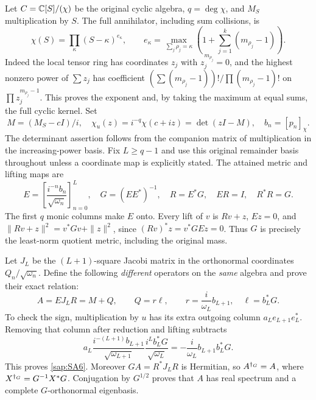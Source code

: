 Let $C=\mathbb C[S]/(\chi)$ be the original cyclic algebra,
$q=\deg\chi$, and $M_S$ multiplication by $S$.
The full annihilator, including sum collisions, is
\begin{equation}\tag{SA3}\label{sap:SA3}
\chi(S)=\prod_\kappa(S-\kappa)^{e_\kappa},
\qquad
e_\kappa=\max_{\sum_j\rho_j=\kappa}
\left(1+\sum_{j=1}^k(m_{\rho_j}-1)\right).
\end{equation}
Indeed the local tensor ring has coordinates $z_j$ with
$z_j^{m_{\rho_j}}=0$, and the highest nonzero power of
$\sum z_j$ has coefficient
$(\sum(m_{\rho_j}-1))!/\prod(m_{\rho_j}-1)!$ on
$\prod z_j^{m_{\rho_j}-1}$. This proves the exponent and,
by taking the maximum at equal sums, the full cyclic kernel.
Set
\begin{equation}\tag{SA4}\label{sap:SA4}
M=(M_S-cI)/i,\quad
\chi_u(z)=i^{-q}\chi(c+iz)=\det(zI-M),\quad b_n=[p_n]_\chi.
\end{equation}
The determinant assertion follows from the companion
matrix of multiplication in the increasing-power basis.
Fix $L\geq q-1$ and use this original remainder basis
throughout unless a coordinate map is explicitly stated.
The attained metric and lifting maps are
\begin{equation}\tag{SA5}\label{sap:SA5}
E=\left[\frac{i^{-n}b_n}{\sqrt{\omega_n}}\right]_{n=0}^L,\quad
G=(EE^*)^{-1},\quad R=E^*G,\quad ER=I,\quad R^*R=G.
\end{equation}
The first $q$ monic columns make $E$ onto. Every lift of
$v$ is $Rv+z$, $Ez=0$, and
$\|Rv+z\|^2=v^*Gv+\|z\|^2$, since
$(Rv)^*z=v^*GEz=0$. Thus $G$ is precisely the least-norm
quotient metric, including the original mass.

Let $J_L$ be the $(L+1)$-square Jacobi matrix in the
orthonormal coordinates $Q_n/\sqrt{\omega_n}$.
Define the following \emph{different} operators on the
\emph{same} algebra and prove their exact relation:
\begin{equation}\tag{SA6}\label{sap:SA6}
A=EJ_LR=M+Q,\qquad
Q=r\ell,\qquad
r=\frac{i}{\omega_L}b_{L+1},\quad \ell=b_L^*G.
\end{equation}
To check the sign, multiplication by $u$ has its extra
outgoing column $a_Le_{L+1}e_L^*$. Removing that column
after reduction and lifting subtracts
\[
a_L\frac{i^{-(L+1)}b_{L+1}}{\sqrt{\omega_{L+1}}}
\frac{i^Lb_L^*G}{\sqrt{\omega_L}}
=-\frac{i}{\omega_L}b_{L+1}b_L^*G.
\]
This proves \eqref{sap:SA6}. Moreover $GA=R^*J_LR$ is
Hermitian, so $A^{\dagger_G}=A$, where $X^{\dagger_G}=G^{-1}X^*G$.
Conjugation by $G^{1/2}$ proves that $A$ has real spectrum
and a complete $G$-orthonormal eigenbasis.

